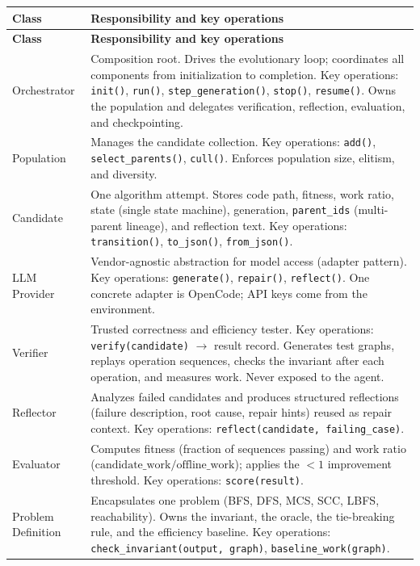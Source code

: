 \documentclass[12pt,a4paper]{article}
\begin{document}
\begin{longtable}{|p{3cm}|p{10cm}|}
\hline
\textbf{Class} & \textbf{Responsibility and key operations} \\
\hline
\endfirsthead
\hline
\textbf{Class} & \textbf{Responsibility and key operations} \\
\hline
\endhead
\hline
\endfoot

Orchestrator & Composition root. Drives the evolutionary loop; coordinates all components from initialization to completion. Key operations: \texttt{init()}, \texttt{run()}, \texttt{step\_generation()}, \texttt{stop()}, \texttt{resume()}. Owns the population and delegates verification, reflection, evaluation, and checkpointing. \\
\hline
Population & Manages the candidate collection. Key operations: \texttt{add()}, \texttt{select\_parents()}, \texttt{cull()}. Enforces population size, elitism, and diversity. \\
\hline
Candidate & One algorithm attempt. Stores code path, fitness, work ratio, state (single state machine), generation, \texttt{parent\_ids} (multi-parent lineage), and reflection text. Key operations: \texttt{transition()}, \texttt{to\_json()}, \texttt{from\_json()}. \\
\hline
LLM Provider & Vendor-agnostic abstraction for model access (adapter pattern). Key operations: \texttt{generate()}, \texttt{repair()}, \texttt{reflect()}. One concrete adapter is OpenCode; API keys come from the environment. \\
\hline
Verifier & Trusted correctness and efficiency tester. Key operations: \texttt{verify(candidate)} $\to$ result record. Generates test graphs, replays operation sequences, checks the invariant after each operation, and measures work. Never exposed to the agent. \\
\hline
Reflector & Analyzes failed candidates and produces structured reflections (failure description, root cause, repair hints) reused as repair context. Key operations: \texttt{reflect(candidate, failing\_case)}. \\
\hline
Evaluator & Computes fitness (fraction of sequences passing) and work ratio ($\text{candidate\_work}/\text{offline\_work}$); applies the $<1$ improvement threshold. Key operations: \texttt{score(result)}. \\
\hline
Problem Definition & Encapsulates one problem (BFS, DFS, MCS, SCC, LBFS, reachability). Owns the invariant, the oracle, the tie-breaking rule, and the efficiency baseline. Key operations: \texttt{check\_invariant(output, graph)}, \texttt{baseline\_work(graph)}. \\

\end{longtable}
\end{document}
